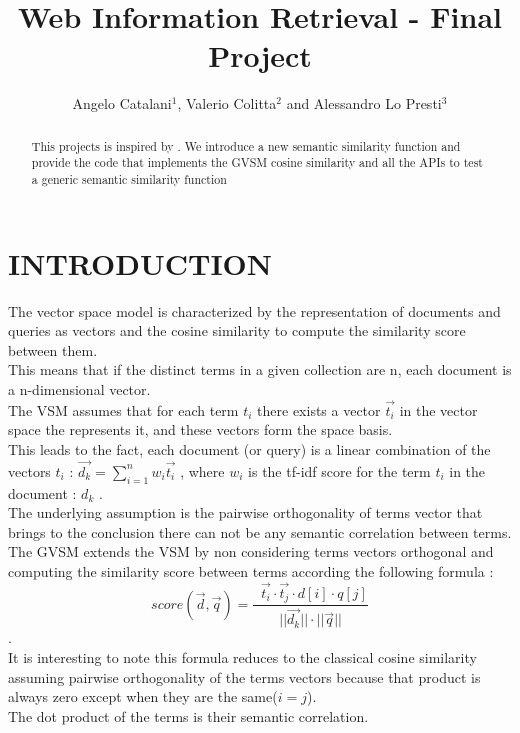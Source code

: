 \documentclass[letterpaper, 10 pt, conference]{ieeeconf}  %
\title{\LARGE \bf
Web Information Retrieval - Final Project
}
\author{Angelo Catalani$^{1}$, Valerio Colitta$^{2}$ and Alessandro Lo Presti$^{3}$}%
\begin{document}
\maketitle
\thispagestyle{empty}
\pagestyle{empty}


\begin{abstract}

This projects is inspired by \cite{c1}. We introduce a new semantic similarity function and provide the code that implements the GVSM cosine similarity and all the APIs to test a generic semantic similarity function


\end{abstract}


\section{INTRODUCTION}

The vector space model is characterized by the representation of documents and queries as vectors and the cosine similarity to compute the similarity score between them.\\This means that if the distinct terms in a given collection are n, each document is a n-dimensional vector.\\The VSM assumes that for each term $t_i$ there exists a vector $\vec{t_i}$ in the vector space the represents it, and these vectors form the space basis.\\This leads to the fact, each document (or query) is a linear combination of the vectors $t_i$ : $\vec{d_k} = \sum\limits_{i=1}^n w_i\vec{t_i}$ , where $w_i$ is the tf-idf score for the term $t_i$ in the document : $d_k$  .\\The underlying assumption is the pairwise orthogonality of terms vector that brings to the conclusion there can not be any semantic correlation between terms.\\The GVSM extends the VSM by non considering terms vectors orthogonal and computing the similarity score between terms according the following formula : 
\begin{equation}
    score(\vec{d},\vec{q}) = \frac{\mathop{\sum_{j=1}^{n'}\sum_{i=1}^{n'}}\vec{t_i}\cdot\vec{t_j}\cdot d[i]\cdot q[j] }{||\vec{d_k} ||\cdot||\vec{q} ||}
\end{equation}.\\It is interesting to note this formula reduces to the classical cosine similarity assuming pairwise orthogonality of the terms vectors because that product is always zero except when they are the same($i=j$).\\The dot product of the terms is their semantic correlation.
\end{document}
